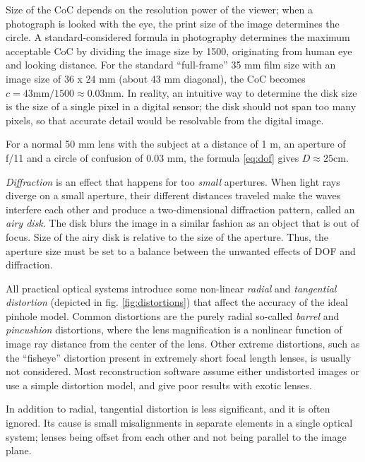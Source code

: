 Size of the CoC depends on the resolution power of the viewer; when a photograph is looked with the eye, the print size of the image determines the circle.
A standard-considered formula in photography determines the maximum acceptable CoC by dividing the image size by 1500, originating from human eye and looking distance.
For the standard ``full-frame'' 35 mm film size with an image size of 36 x 24 mm (about 43 mm diagonal), the CoC becomes $c = 43 \text{mm} / 1500 \approx 0.03 \text{mm}$.
In reality, an intuitive way to determine the disk size is the size of a single pixel in a digital sensor;
the disk should not span too many pixels, so that accurate detail would be resolvable from the digital image.

For a normal 50 mm lens with the subject at a distance of 1 m, an aperture of f/11 and a circle of confusion of 0.03 mm, the formula \ref{eq:dof} gives $D \approx 25 \text{cm}$. %


\emph{Diffraction} is an effect that happens for too \emph{small} apertures.
When light rays diverge on a small aperture, their different distances traveled make the waves interfere each other and produce a two-dimensional diffraction pattern, called an \emph{airy disk}.
The disk blurs the image in a similar fashion as an object that is out of focus.
Size of the airy disk is relative to the size of the aperture.
Thus, the aperture size must be set to a balance between the unwanted effects of DOF and diffraction.


All practical optical systems introduce some non-linear \emph{radial} and \emph{tangential distortion} (depicted in fig. \ref{fig:distortions}) that affect the accuracy of the ideal pinhole model.
Common distortions are the purely radial so-called \emph{barrel} and \emph{pincushion} distortions, where the lens magnification is a nonlinear function of image ray distance from the center of the lens. \cite{brown1966decentering}
Other extreme distortions, such as the ``fisheye'' distortion present in extremely short focal length lenses, is usually not considered.
Most reconstruction software assume either undistorted images or use a simple distortion model, and give poor results with exotic lenses.

In addition to radial, tangential distortion is less significant, and it is often ignored.
Its cause is small misalignments in separate elements in a single optical system; lenses being offset from each other and not being parallel to the image plane. \cite{kingslake1989history}

